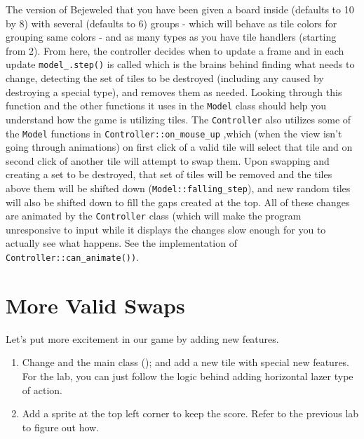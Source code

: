 \documentclass{tufte-handout}
\begin{document}
The version of Bejeweled that you have been given a board inside  (defaults to 10 by 8) with
several (defaults to 6) groups - which will behave as tile colors for
grouping same colors - and as many types as you have tile handlers (starting
from 2). From here, the controller decides when to update a frame and in each
update \verb!model_.step()! is called which is the brains behind
finding what needs to change, detecting the set of tiles to be destroyed
(including any caused by destroying a special type), and removes them as
needed. Looking through this function and the other functions it uses in
the \verb^Model^ class should help you understand how the game is utilizing
tiles. The \verb^Controller^ also utilizes some of the \verb^Model^ functions
in \verb!Controller::on_mouse_up! ,which (when the view isn't going through
animations) on first click of a valid tile will select that tile and on
second click of another tile will attempt to swap them. Upon swapping and
creating a set to be destroyed, that set of tiles will be removed and the
tiles above them will be shifted down (\texttt{Model::falling_step}), and new random tiles will also be
shifted down to fill the gaps created at the top. All of these changes are
animated by the \verb^Controller^ class (which will make the program unresponsive to
input while it displays the changes slow enough for you to actually see what
happens. See the implementation of \texttt{Controller::can_animate())}.

\section{More Valid Swaps}

Let's put more excitement in our game by adding new features. 

\begin{enumerate}
  \item Change   and the main class (); and add a new tile with special new features. For the lab, you can just follow the logic behind adding horizontal lazer type of action.

  \item Add a sprite at the top left corner to keep the score. Refer to the previous lab to figure out how.
\end{enumerate}
\end{document}
